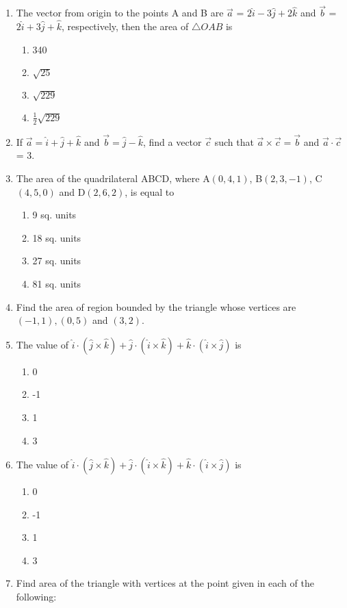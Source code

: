 \begin{enumerate}[label=\thesubsection.\arabic*,ref=\thesubsection.\theenumi]
\item The vector from origin to the points A and B are $\vec{a}$ = $2\hat{i}-3\hat{j}+2\hat{k}$ and  $\vec{b}$ = $2\hat{i}+3\hat{j}+\hat{k}$, respectively, then the area of $\triangle {OAB}$ is
	\begin{enumerate}
\item 340 
\item $\sqrt{25}$
\item $\sqrt{229}$
\item $\frac{1}{2}\sqrt{229}$
\end{enumerate}
\item If $\vec{a} = \hat{i}+\hat{j}+\hat{k}$ and $\vec{b} = \hat{j}-\hat{k}$, find a vector $\vec{c}$ such that $\vec{a}\times\vec{c} = \vec{b}$ and $\vec{a}\cdot \vec{c}$ = 3.
%
\item The area of the quadrilateral ABCD, where A$(0,4,1)$, B$(2,3,-1)$, C$(4,5,0)$ and D$(2,6,2)$, is equal to 
\begin{enumerate}
	\item 9 sq. units
	\item 18 sq. units 
	\item 27 sq. units 
	\item 81 sq. units
\end{enumerate}
\item Find the area of region bounded by the triangle whose vertices are $(-1, 1), (0, 5)$ and $(3, 2)$.
\item The value of $\hat{i}\cdot(\hat{j}\times\hat{k})+\hat{j}\cdot(\hat{i}\times\hat{k})+\hat{k}\cdot(\hat{i}\times\hat{j})$ is
\begin{enumerate}
\item 0
\item -1
\item 1
\item 3
\end{enumerate}
\item The value of $\hat{i}\cdot (\hat{j}\times\hat{k})+\hat{j}\cdot (\hat{i}\times\hat{k})+\hat{k}\cdot (\hat{i}\times\hat{j})$ is
\begin{enumerate}
\item 0
\item -1
\item 1
\item 3
\end{enumerate}
\item Find area of the triangle with vertices at the point given in each of the following:
\begin{enumerate}

\end{enumerate}
\end{enumerate}
